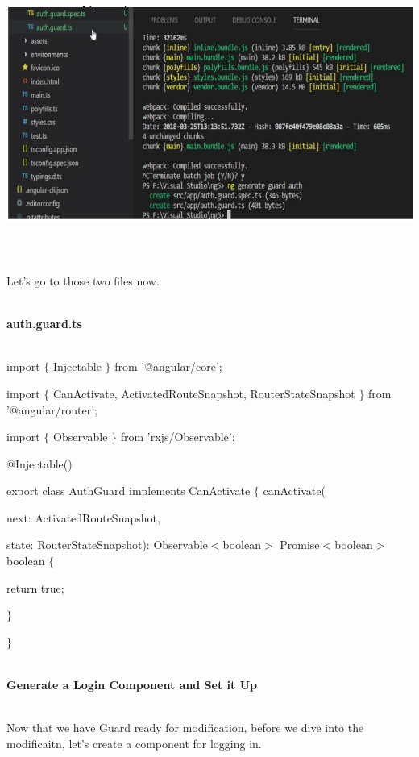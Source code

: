\documentclass{article}
\begin{document}
\begin{center}
	\noindent \includegraphics*[width=6.26in, height=3.31in]{IMG-05-12} 
\end{center}

\noindent \\ Let's go to those two files now.

\noindent 

\noindent \\ \textbf{auth.guard.ts}

\noindent \\ import $\mathrm{\{}$ Injectable $\mathrm{\}}$ from '@angular/core';

\noindent import $\mathrm{\{}$ CanActivate, ActivatedRouteSnapshot, RouterStateSnapshot $\mathrm{\}}$ from '@angular/router'; 

\noindent import $\mathrm{\{}$ Observable $\mathrm{\}}$ from 'rxjs/Observable';

\noindent @Injectable()

\noindent  export class AuthGuard implements CanActivate $\mathrm{\{}$ canActivate(

\noindent next: ActivatedRouteSnapshot,

\noindent state: RouterStateSnapshot): Observable$\mathrm{<}$boolean$\mathrm{>}$ {\textbar} Promise$\mathrm{<}$boolean$\mathrm{>}$ {\textbar} boolean $\mathrm{\{}$ 

\noindent return true;

\noindent $\mathrm{\}}$

\noindent $\mathrm{\}}$

 
\newpage
\noindent \\ \textbf{Generate a Login Component and Set it Up}

\noindent \\ Now that we have Guard ready for modification, before we dive into the modificaitn, let's create a component for logging in.
\end{document}
